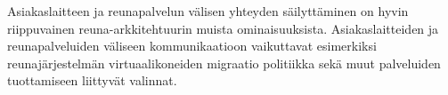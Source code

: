 Asiakaslaitteen ja reunapalvelun välisen yhteyden säilyttäminen on hyvin riippuvainen reuna-arkkitehtuurin muista ominaisuuksista. Asiakaslaitteiden ja reunapalveluiden väliseen kommunikaatioon vaikuttavat esimerkiksi reunajärjestelmän virtuaalikoneiden migraatio politiikka sekä muut palveluiden tuottamiseen liittyvät valinnat.








